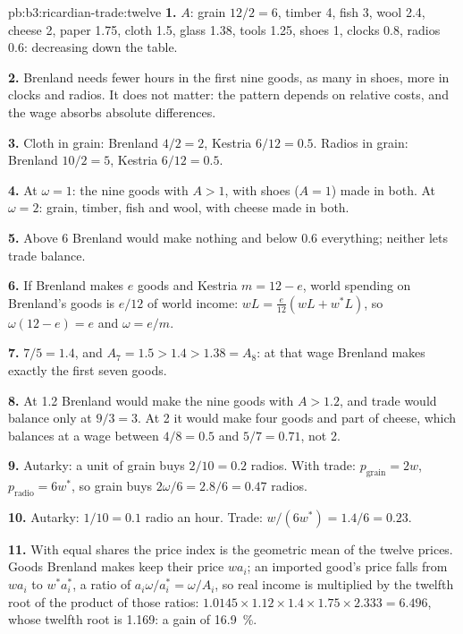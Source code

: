 \begin{solution}{pb:b3:ricardian-trade:twelve}
\textbf{1.} $A$: grain $12/2 = 6$, timber 4, fish 3, wool 2.4, cheese 2, paper 1.75,
cloth 1.5, glass 1.38, tools 1.25, shoes 1, clocks 0.8, radios 0.6: decreasing down
the table. %

\textbf{2.} Brenland needs fewer hours in the first nine goods, as many in shoes,
more in clocks and radios. It does not matter: the pattern depends on relative
costs, and the wage absorbs absolute differences.

\textbf{3.} Cloth in grain: Brenland $4/2 = 2$, Kestria $6/12 = 0.5$. Radios in grain:
Brenland $10/2 = 5$, Kestria $6/12 = 0.5$.

\textbf{4.} At $\omega = 1$: the nine goods with $A > 1$, with shoes ($A = 1$) made in
both. At $\omega = 2$: grain, timber, fish and wool, with cheese made in both.

\textbf{5.} Above 6 Brenland would make nothing and below 0.6 everything; neither
lets trade balance.

\textbf{6.} If Brenland makes $e$ goods and Kestria $m = 12 - e$, world spending on
Brenland's goods is $e/12$ of world income: $wL = \tfrac{e}{12}(wL + w^*L)$, so $\omega(12 -
e) = e$ and $\omega = e/m$.

\textbf{7.} $7/5 = 1.4$, and $A_7 = 1.5 > 1.4 > 1.38 = A_8$: at that wage Brenland makes
exactly the first seven goods. %

\textbf{8.} At 1.2 Brenland would make the nine goods with $A > 1.2$, and trade would
balance only at $9/3 = 3$. At 2 it would make four goods and part of cheese,
which balances at a wage between $4/8 = 0.5$ and $5/7 = 0.71$, not 2.

\textbf{9.} Autarky: a unit of grain buys $2/10 = 0.2$ radios. With trade: $p_{\text{grain}}
= 2w$, $p_{\text{radio}} = 6w^*$, so grain buys $2\omega/6 = 2.8/6 = 0.47$ radios.

\textbf{10.} Autarky: $1/10 = 0.1$ radio an hour. Trade: $w/(6w^*) = 1.4/6 = 0.23$.

\textbf{11.} With equal shares the price index is the geometric mean of the twelve
prices. Goods Brenland makes keep their price $wa_i$; an imported good's price
falls from $wa_i$ to $w^*a_i^*$, a ratio of $a_i\omega/a_i^* = \omega/A_i$, so real income is
multiplied by the twelfth root of the product of those ratios: $1.0145 \times 1.12
\times 1.4 \times 1.75 \times 2.333 = 6.496$, whose twelfth root is 1.169: a gain of
16.9~\%.


\end{solution}
